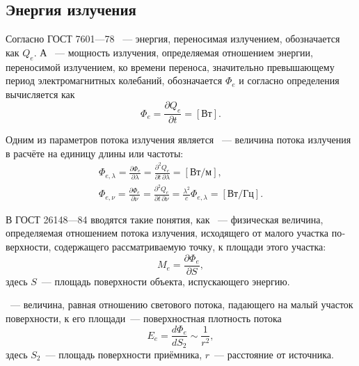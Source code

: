 \subsection{Энергия излучения}
Согласно ГОСТ 7601---78 ~--- энергия, переносимая излучением, обозначается как $Q_e$. А ~--- мощность излучения, определяемая отношением энергии, переносимой излучением, ко времени переноса,  значительно превышающему период электромагнитных колебаний, обозначается $\Phi_e$ и согласно определения вычисляется как
\begin{equation}
    \Phi_e = \frac{\partial Q_e}{\partial t} = [\text{Вт}].
\end{equation}

Одним из параметров потока излучения является ~--- величина потока излучения в расчёте на единицу длины или частоты:
\begin{gather*}
    \Phi_{e, \lambda}
    = \frac{\partial \Phi_e}{\partial \lambda} 
    = \frac{\partial^2 Q_e}{\partial t \, \partial \lambda}
    = [\text{Вт/м}],\\
    \Phi_{e, \nu} 
    = \frac{\partial \Phi_e}{\partial \nu} 
    = \frac{\partial^2 Q_e}{\partial t \, \partial \nu}
    = \frac{\lambda^2}{c}\Phi_{e, \lambda}
    = [\text{Вт/Гц}].
\end{gather*}


В ГОСТ 26148---84 вводятся такие понятия, как ~--- физическая величина, определяемая отношением потока излучения, исходящего от малого участка по­верхности, содержащего рассматри­ваемую точку, к площади этого участка:
\begin{equation}
    M_e = \frac{\partial \Phi_e}{\partial S},
\end{equation}
здесь $S$~--- площадь поверхности объекта, испускающего энергию.

~--- величина, равная отношению светового потока, падающего на малый участок поверхности, к его площади~--- поверхностная плотность потока
\begin{equation}
    E_e = \frac{d\Phi_e}{dS_2} \sim \frac{1}{r^2},
\end{equation}
здесь $S_2$~--- площадь поверхности приёмника, $r$~--- расстояние от источника.

